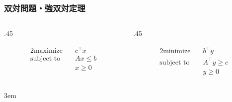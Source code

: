 \documentclass[14pt,aspectratio=169,xcolor=dvipsnames,table,onlytextwidth,dvipdfmx]{beamer}
\begin{document}
\begin{frame}[t]
    \frametitle{双対問題・強双対定理}
    \begin{columns}[T]
    \begin{column}{.45\textwidth}
    \begin{primal}
        \setlength{\abovedisplayskip}{0pt}
        \begin{alignat*}{2}
            \text{maximize} & \quad  c^\top x \\
            \text{subject to} & \quad A x \leq b  \\
            & \quad x \geq 0 
        \end{alignat*}
    \end{primal}
    \end{column}
    \begin{column}{.45\textwidth}
    \begin{dual}
        \setlength{\abovedisplayskip}{0pt}
        \begin{alignat*}{2}
            \text{minimize} & \quad  b^\top y \\
            \text{subject to} & \quad A^\top y \geq c  \\
            & \quad y \geq 0 
        \end{alignat*}
    \end{dual}
    \end{column}
    \end{columns}
    
    \begin{overlayarea}{\textwidth}{3em}
    \end{overlayarea}
\end{frame}
\end{document}
